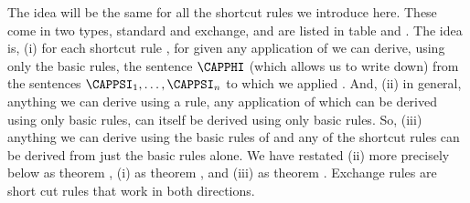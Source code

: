 The idea will be the same for all the shortcut rules we introduce here. These come in two types, standard and exchange, and are listed in table  and . The idea is, (i) for each shortcut rule , for given any application of  we can derive, using only the basic rules, the sentence $\CAPPHI$ (which  allows us to write down) from the sentences $\CAPPSI_1,\ldots,\CAPPSI_{\integer{n}}$ to which we applied . 
And, (ii) in general, anything we can derive using a rule, any application of which can be derived using only basic rules, can itself be derived using only basic rules.  
So, (iii) anything we can derive using the basic rules of \GSD{} and any of the shortcut rules can be derived from just the basic rules alone.
We have restated (ii) more precisely below as theorem , (i) as theorem , and (iii) as theorem . 
Exchange rules are short cut rules that work in both directions.

